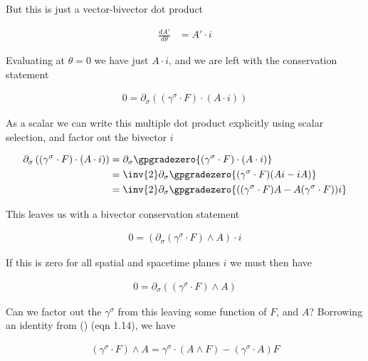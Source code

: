 But this is just a vector-bivector dot product

\begin{align}\label{eqn:maxwellLagRot:goo8}
\frac{dA'}{d\theta} &= A' \cdot i
\end{align}

Evaluating at $\theta = 0$ we have just $A \cdot i$, and we are left with the conservation statement

\begin{align}\label{eqn:maxwellLagRot:goo9}
0 = \partial_\sigma \left( (\gamma^\sigma \cdot F) \cdot (A \cdot i) \right)
\end{align}

As a scalar we can write this multiple dot product explicitly using scalar selection, and factor out the bivector $i$

\begin{align*}
\partial_\sigma \left( (\gamma^\sigma \cdot F) \cdot (A \cdot i) \right)
&=
\partial_\sigma \gpgradezero{ (\gamma^\sigma \cdot F) \cdot (A \cdot i) } \\
&=
\inv{2} \partial_\sigma \gpgradezero{ (\gamma^\sigma \cdot F) (A i - i A) } \\
&=
\inv{2} \partial_\sigma \gpgradezero{ ((\gamma^\sigma \cdot F) A -A (\gamma^\sigma \cdot F)) i } \\
\end{align*}

This leaves us with a bivector conservation statement

\begin{align}\label{eqn:maxwellLagRot:goo10}
0 = \left( \partial_\sigma (\gamma^\sigma \cdot F) \wedge A \right) \cdot i
\end{align}

If this is zero for all spatial and spacetime planes $i$ we must then have

\begin{align}\label{eqn:maxwellLagRot:goo11}
0 = \partial_\sigma \left( (\gamma^\sigma \cdot F) \wedge A \right)
\end{align}

Can we factor out the $\gamma^\sigma$ from this leaving some function of $F$, and $A$?  Borrowing an identity from (\cite{hestenes1999nfc}) (eqn 1.14), we have

\begin{align}\label{eqn:maxwellLagRot:goo16}
( \gamma^\sigma \cdot F ) \wedge A = \gamma^\sigma \cdot (A \wedge F ) - (\gamma^\sigma \cdot A) F
\end{align}

